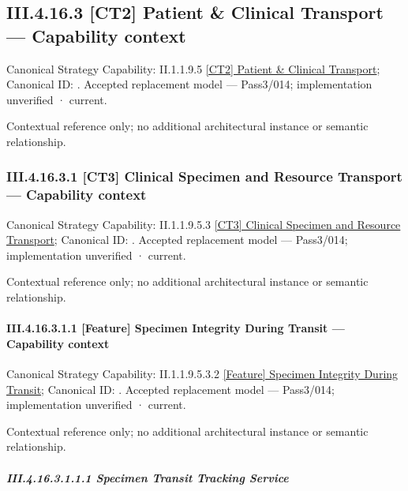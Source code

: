 \subsection*{III.4.16.3 [CT2] Patient \& Clinical Transport — Capability context}
\label{navigation:III.4.16.3}

{\small Canonical Strategy Capability: II.1.1.9.5 \hyperref[element:55fbb4688dab4a5aa521962a50e4f8cd]{[CT2] Patient \& Clinical Transport}; Canonical ID: \texttt{}. Accepted replacement model — Pass3/014; implementation unverified · current.}\par
Contextual reference only; no additional architectural instance or semantic relationship.\par
\subsubsection*{III.4.16.3.1 [CT3] Clinical Specimen and Resource Transport — Capability context}
\label{navigation:III.4.16.3.1}

{\small Canonical Strategy Capability: II.1.1.9.5.3 \hyperref[element:fd826c844d1c4f20ac520eb61fb842a4]{[CT3] Clinical Specimen and Resource Transport}; Canonical ID: \texttt{}. Accepted replacement model — Pass3/014; implementation unverified · current.}\par
Contextual reference only; no additional architectural instance or semantic relationship.\par
\paragraph*{III.4.16.3.1.1 [Feature] Specimen Integrity During Transit — Capability context}
\label{navigation:III.4.16.3.1.1}

{\small Canonical Strategy Capability: II.1.1.9.5.3.2 \hyperref[element:3a4fe65d99f14a7aae0da08a6470dea4]{[Feature] Specimen Integrity During Transit}; Canonical ID: \texttt{}. Accepted replacement model — Pass3/014; implementation unverified · current.}\par
Contextual reference only; no additional architectural instance or semantic relationship.\par
\subparagraph*{III.4.16.3.1.1.1 Specimen Transit Tracking Service}
\label{navigation:III.4.16.3.1.1.1}

